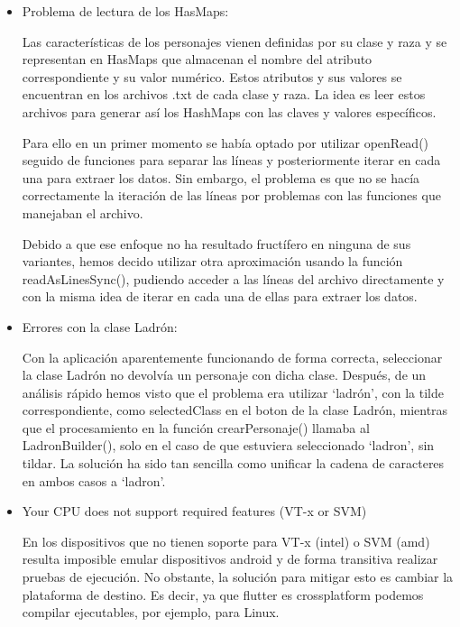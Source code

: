 \documentclass{article}
\begin{document}
\begin{itemize}
    \item Problema de lectura de los HasMaps:
    
    \hspace{1cm}Las características de los personajes vienen definidas por su clase y raza y se representan en HasMaps que almacenan el nombre del atributo correspondiente y su valor numérico. Estos atributos y sus valores se encuentran en los archivos .txt de cada clase y raza. La idea es leer estos archivos para generar así los HashMaps con las claves y valores específicos.
    
    \hspace{1cm}Para ello en un primer momento se había optado por utilizar openRead() seguido de funciones para separar las líneas y posteriormente iterar en cada una para extraer los datos. Sin embargo, el problema es que no se hacía correctamente la iteración de las líneas por problemas con las funciones que manejaban el archivo.

    \hspace{1cm}Debido a que ese enfoque no ha resultado fructífero en ninguna de sus variantes, hemos decido utilizar otra aproximación usando la función readAsLinesSync(), pudiendo acceder a las líneas del archivo directamente y con la misma idea de iterar en cada una de ellas para extraer los datos.


    \item Errores con la clase Ladrón:

    \hspace{1cm}Con la aplicación aparentemente funcionando de forma correcta, seleccionar la clase Ladrón no devolvía un personaje con dicha clase. Después, de un análisis rápido hemos visto que el problema era utilizar `ladrón', con la tilde correspondiente, como selectedClass en el boton de la clase Ladrón, mientras que el procesamiento en la función \textunderscore{}crearPersonaje() llamaba al LadronBuilder(), solo en el caso de que estuviera seleccionado `ladron', sin tildar. La solución ha sido tan sencilla como unificar la cadena de caracteres en ambos casos a `ladron'.
    
    \item Your CPU does not support required features (VT-x or SVM)
    
    \hspace{1cm} En los dispositivos que no tienen soporte para VT-x (intel) o SVM (amd) resulta imposible emular dispositivos android y de forma transitiva realizar pruebas de ejecución. No obstante, la solución para mitigar esto es cambiar la plataforma de destino. Es decir, ya que flutter es crossplatform podemos compilar ejecutables, por ejemplo, para Linux.  
    
\end{itemize}
\end{document}
